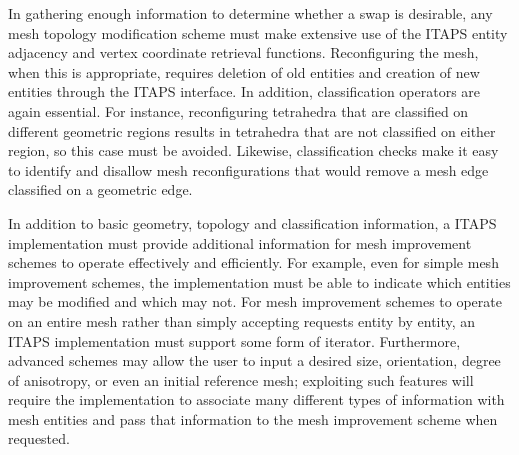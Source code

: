 In gathering enough information to determine whether a swap is
desirable, any mesh topology modification scheme must make extensive use
of the ITAPS entity adjacency and vertex coordinate retrieval functions.
Reconfiguring the mesh, when this is appropriate, requires deletion of
old entities and creation of new entities through the ITAPS interface.
In addition, classification operators are again essential.  For
instance, reconfiguring tetrahedra that are classified on different
geometric regions results in tetrahedra that are not classified on
either region, so this case must be avoided.  Likewise, classification
checks make it easy to identify and disallow mesh reconfigurations that
would remove a mesh edge classified on a geometric edge.

In addition to basic geometry, topology and classification information,
a ITAPS implementation must provide additional information for mesh
improvement schemes to operate effectively and efficiently.  For
example, even for simple mesh improvement schemes, the implementation
must be able to indicate which entities may be modified and which may
not.  For mesh improvement schemes to operate on an entire mesh rather
than simply accepting requests entity by entity, an ITAPS implementation
must support some form of iterator.  Furthermore, advanced schemes may
allow the user to input a desired size, orientation, degree of
anisotropy, or even an initial reference mesh; exploiting such features
will require the implementation to associate many different types of
information with mesh entities and pass that information to the mesh
improvement scheme when requested.
